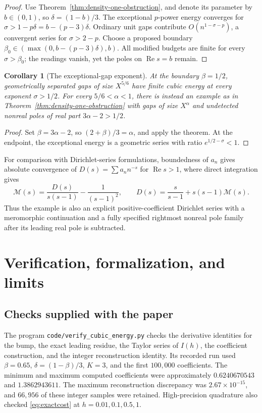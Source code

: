 \documentclass[11pt,a4paper]{article}
\newtheorem{corollary}[theorem]{Corollary}
\theoremstyle{definition}
\theoremstyle{remark}
\numberwithin{equation}{section}
\newcommand{\Rea}{\operatorname{Re}}
\begin{document}
\begin{proof}
Use Theorem~\ref{thm:density-one-obstruction}, and denote its
parameter by \(b\in(0,1)\), so \(\delta=(1-b)/3\).
The exceptional \(p\)-power energy converges for
\(\sigma>1-p\delta=b-(p-3)\delta\).
Ordinary unit gaps contribute \(O(n^{1-\sigma-p})\), a convergent
series for \(\sigma>2-p\).
Choose a proposed boundary
\(\beta_0\in(\max(0,b-(p-3)\delta),b)\).
All modified budgets are finite for every \(\sigma>\beta_0\);
the readings vanish, yet the poles on \(\Rea s=b\) remain.
\end{proof}

\begin{corollary}[The exceptional-gap exponent]
At the boundary $\beta=1/2$, geometrically separated gaps of size
$X^{5/6}$ have finite cubic energy at every exponent $\sigma>1/2$.
For every $5/6<\alpha<1$, there is instead an example as in
Theorem~\ref{thm:density-one-obstruction} with gaps of size $X^\alpha$
and undetected nonreal poles of real part $3\alpha-2>1/2$.
\end{corollary}

\begin{proof}
Set $\beta=3\alpha-2$, so $(2+\beta)/3=\alpha$, and apply the theorem.
At the endpoint, the exceptional energy is a geometric series with
ratio $e^{1/2-\sigma}<1$.
\end{proof}

For comparison with Dirichlet-series formulations, boundedness of
$a_n$ gives absolute convergence of $D(s)=\sum a_nn^{-s}$ for
$\operatorname{Re}s>1$, where direct integration gives
\[
 \mathcal M(s)=\frac{D(s)}{s(s-1)}-\frac1{(s-1)^2},
 \qquad D(s)=\frac{s}{s-1}+s(s-1)\mathcal M(s).
\]
Thus the example is also an explicit positive-coefficient Dirichlet
series with a meromorphic continuation and a fully specified rightmost
nonreal pole family after its leading real pole is subtracted.

\section{Verification, formalization, and limits}
\label{sec:verification}

\subsection{Checks supplied with the paper}

The program \texttt{code/verify\_cubic\_energy.py} checks the derivative
identities for the bump, the exact leading residue, the Taylor series
of \(I(h)\), the coefficient construction, and the integer
reconstruction identity. Its recorded run used
\(\beta=0.65\), \(\delta=(1-\beta)/3\), \(K=3\), and the first
\(100{,}000\) coefficients. The minimum and maximum computed
coefficients were approximately \(0.6240670543\) and
\(1.3862943611\). The maximum reconstruction discrepancy was
\(2.67\times10^{-15}\), and \(66{,}956\) of these integer samples
were retained. High-precision quadrature also checked
\eqref{eq:exactcost} at \(h=0.01,0.1,0.5,1\).
\end{document}
